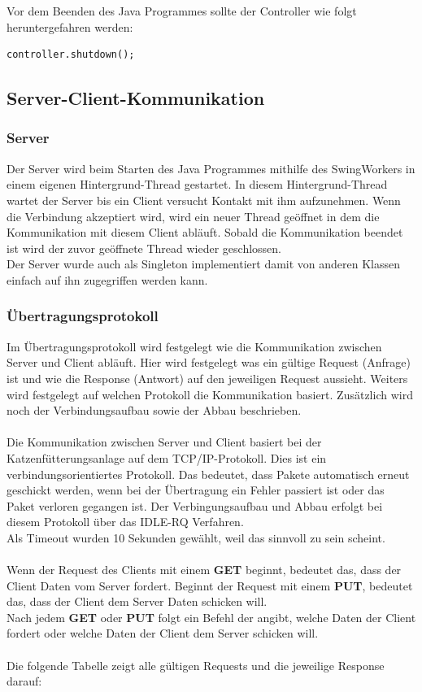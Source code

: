 Vor dem Beenden des Java Programmes sollte der Controller wie folgt heruntergefahren werden:
\begin{lstlisting}[style=JavaStyle, caption=Controller herunterfahren]
	controller.shutdown();
\end{lstlisting}

\newpage

\subsection{Server-Client-Kommunikation}
\subsubsection{Server}
Der Server wird beim Starten des Java Programmes mithilfe des SwingWorkers in einem eigenen Hintergrund-Thread gestartet. In diesem Hintergrund-Thread wartet der Server bis ein Client versucht Kontakt mit ihm aufzunehmen. Wenn die Verbindung akzeptiert wird, wird ein neuer Thread geöffnet in dem die Kommunikation mit diesem Client abläuft. Sobald die Kommunikation beendet ist wird der zuvor geöffnete Thread wieder geschlossen. 
\\ Der Server wurde auch als Singleton implementiert damit von anderen Klassen einfach auf ihn zugegriffen werden kann.

\subsubsection{Übertragungsprotokoll}
Im Übertragungsprotokoll wird festgelegt wie die Kommunikation zwischen Server und Client abläuft. Hier wird festgelegt was ein gültige Request (Anfrage) ist und wie die Response (Antwort) auf den jeweiligen Request aussieht. Weiters wird festgelegt auf welchen Protokoll die Kommunikation basiert. Zusätzlich wird noch der Verbindungsaufbau sowie der Abbau beschrieben.
\\ \\
Die Kommunikation zwischen Server und Client basiert bei der Katzenfütterungsanlage auf dem TCP/IP-Protokoll. Dies ist ein verbindungsorientiertes Protokoll. Das bedeutet, dass Pakete automatisch erneut geschickt werden, wenn bei der Übertragung ein Fehler passiert ist oder das Paket verloren gegangen ist. Der Verbingungsaufbau und Abbau erfolgt bei diesem Protokoll über das IDLE-RQ Verfahren.
\\ Als Timeout wurden 10 Sekunden gewählt, weil das sinnvoll zu sein scheint.
\\ \\
Wenn der Request des Clients mit einem \textbf{GET} beginnt, bedeutet das, dass der Client Daten vom Server fordert. Beginnt der Request mit einem \textbf{PUT}, bedeutet das, dass der Client dem Server Daten schicken will.
\\ Nach jedem \textbf{GET} oder \textbf{PUT} folgt ein Befehl der angibt, welche Daten der Client fordert oder welche Daten der Client dem Server schicken will.
\\ \\
Die folgende Tabelle zeigt alle gültigen Requests und die jeweilige Response darauf:

